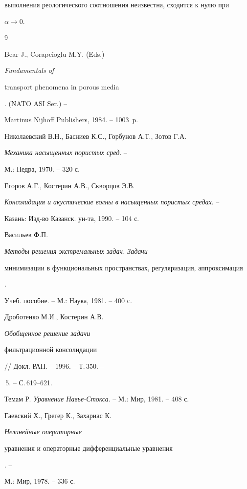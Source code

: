 выполнения реологического соотношения неизвестна,  сходится к нулю при


$\alpha \to 0.$





\begin{thebibliography}{9}







Bear J., Corapcioglu M.Y. (Eds.) {\em Fundamentals of


transport phenomena in porous media}. (NATO ASI Ser.) --


Martinus Nijhoff Publishers, 1984. -- 1003~p.




Николаевский В.Н., Басниев К.С., Горбунов А.Т., Зотов Г.А.


{\em Механика насыщенных пористых сред}. --


М.: Недра, 1970. -- 320 с.




Егоров А.Г., Костерин А.В., Скворцов Э.В.


{\em Консолидация и акустические волны в насыщенных пористых средах}. --


Казань: Изд-во Казанск. ун-та, 1990. -- 104 с.




Васильев Ф.П. {\em Методы решения экстремальных задач. Задачи


минимизации в функциональных пространствах, регуляризация, аппроксимация}.


Учеб. пособие. -- М.: Наука, 1981. -- 400 с.




Дроботенко М.И., Костерин А.В. {\em Обобщенное решение задачи


фильтрационной консолидации} // Докл. РАН. -- 1996. -- Т.\,350. --


\No\,5. -- С.\,619--621.















Темам Р. {\em Уравнение Навье-Стокса}. -- М.: Мир, 1981. -- 408 с.




Гаевский Х., Грегер К., Захариас К. {\em Нелинейные операторные


уравнения и операторные дифференциальные уравнения}. --


М.: Мир, 1978. -- 336 с.





\end{thebibliography}





